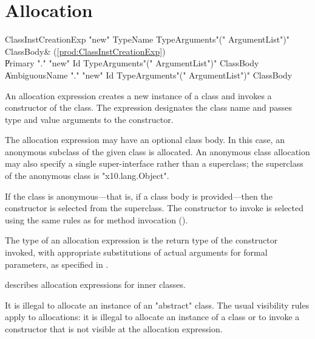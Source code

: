 \section{Allocation}
\label{ClassCreation}

\begin{bbgrammar}
ClassInstCreationExp \: \xcd"new" TypeName TypeArguments\opt \xcd"(" ArgumentList\opt \xcd")" ClassBody\opt & (\ref{prod:ClassInstCreationExp}) \\
                    \| Primary \xcd"." \xcd"new" Id TypeArguments\opt \xcd"(" ArgumentList\opt \xcd")" ClassBody\opt \\
                    \| AmbiguousName \xcd"." \xcd"new" Id TypeArguments\opt \xcd"(" ArgumentList\opt \xcd")" ClassBody\opt \\
\end{bbgrammar}

An allocation expression creates a new instance of a class and
invokes a constructor of the class.
The expression designates the class name and passes
type and value arguments to the constructor.

The allocation expression may have an optional class body.
In this case, an anonymous subclass of the given class is
allocated.   An anonymous class allocation may also specify a
single super-interface rather than a superclass; the superclass
of the anonymous class is \xcd"x10.lang.Object".

If the class is anonymous---that is, if a class body is
provided---then the constructor is selected from the superclass.
The constructor to invoke is selected using the same rules as
for method invocation ().

The type of an allocation expression
is the return type of the constructor invoked, with appropriate
substitutions  of actual arguments for formal parameters, as
specified in .

 describes allocation expressions for inner classes. 

It is illegal to allocate an instance of an \xcd"abstract" class.
The usual visibility rules apply to allocations: 
it is illegal to allocate an instance of a class or to invoke a
constructor that is not visible at
the allocation expression.

